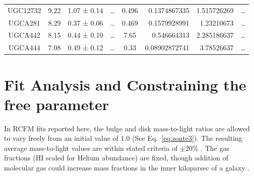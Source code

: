 \documentclass[reprint,%
 amsmath,amssymb,
 aps,
]{revtex4-1}
\begin{document}
\begin{table}[]
\begin{tabular}{cccccrrc}
\rowcolor[HTML]{F3F3F3} 
UGC12732             & 9.22                      & 1.07 ± 0.14           & …                      & 0.496                                                        & 0.1374867335                                                          & 1.515726269                                                           & …                                                             \\
\rowcolor[HTML]{F3F3F3} 
UGCA281              & 8.29                      & 0.37 ± 0.06           & …                      & 0.469                                                        & 0.1579928991                                                          & 1.23210673                                                            & …                                                             \\
\rowcolor[HTML]{F3F3F3} 
UGCA442              & 8.15                      & 0.44 ± 0.10           & …                      & 7.65                                                         & 0.546664313                                                           & 2.285186637                                                           & …                                                             \\
\rowcolor[HTML]{F3F3F3} 
UGCA444              & 7.08                      & 0.49 ± 0.12           & …                      & 0.33                                                         & 0.08902872741                                                         & 3.78526637                                                            & …                                                            
\end{tabular}
\end{table}
\section{Fit Analysis and Constraining the free parameter \label{sec:analysis}}
 
 
In RCFM fits reported here, the    bulge and disk mass-to-light ratios are allowed to vary freely from an initial value of $1.0$ (See Eq.~\ref{eq:zonte3}). The resulting average mass-to-light    values are within stated criteria    of $\pm 20\%$ \cite{2016Lelli}. The gas fractions (HI scaled for Helium abundance) are fixed,  though addition of molecular gas could increase mass fractions in the inner kiloparsec of a galaxy   \cite{2004ApJ...609..652M}.
\end{document}
